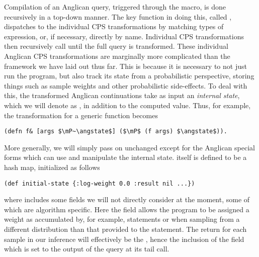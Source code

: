 Compilation of an Anglican query, triggered through the \query macro, is done recursively
in a top-down manner.  The key function in doing this, called ,
dispatches to the individual CPS transformations by matching types of expression, or, if necessary,
directly by name.  Individual CPS transformations then recursively call 
until the full query is transformed.  
These individual Anglican CPS transformations are marginally more complicated than the
framework we have laid out thus far.  This is because it is necessary to not just run the
program, but also track its state from a probabilistic perspective, storing things such
as sample weights and other probabilistic side-effects.  To deal with this, the transformed Anglican
continuations take as input an \emph{internal state}, which we will denote as \angstate,
in addition to the computed value.
Thus, for example, the transformation for a generic function  becomes
\begin{lstlisting}[basicstyle=\ttfamily\small,frame=none]
  (defn f& [args $\mP~\angstate$] ($\mP$ (f args) $\angstate$)).
\end{lstlisting}\vspace{-8pt}
More generally, we will simply pass on \angstate unchanged except for the Anglican
special forms which can use and manipulate the internal state.  \angstate itself
is defined to be a hash map, initialized as follows
\begin{lstlisting}[basicstyle=\ttfamily\small,frame=none]
  (def initial-state {:log-weight 0.0 :result nil ...})
\end{lstlisting}\vspace{-8pt}
where  includes some fields we will not directly consider at the moment, some of which are algorithm
specific.
Here the field  allows the program to be assigned a
weight as accumulated by, for example, \observe statements or 
when sampling from a different distribution than that provided to the \sample statement.
The return for each sample in our inference will effectively be the \angstate, hence the inclusion
of the  field which is set to the output of the query at its tail call.

